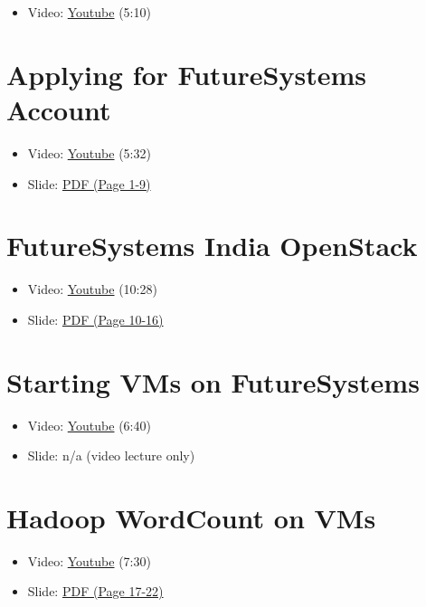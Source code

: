 \begin{itemize}
\tightlist
\item
  Video: \href{https://www.youtube.com/watch?v=zxoqRdvXM28}{Youtube}
  (5:10)
\end{itemize}

\section{Applying for FutureSystems
Account}\label{applying-for-futuresystems-account}

\begin{itemize}
\tightlist
\item
  Video: \href{https://www.youtube.com/watch?v=98ERlWi3k3U}{Youtube}
  (5:32)
\item
  Slide:
  \href{https://drive.google.com/open?id=0B88HKpainTSfZENxeUlOcVFUTkU}{PDF
  (Page 1-9)}
\end{itemize}

\section{FutureSystems India
OpenStack}\label{futuresystems-india-openstack}

\begin{itemize}
\tightlist
\item
  Video: \href{https://www.youtube.com/watch?v=hyKYTpNmJZc}{Youtube}
  (10:28)
\item
  Slide:
  \href{https://drive.google.com/open?id=0B88HKpainTSfZENxeUlOcVFUTkU}{PDF
  (Page 10-16)}
\end{itemize}

\section{Starting VMs on
FutureSystems}\label{starting-vms-on-futuresystems}

\begin{itemize}
\tightlist
\item
  Video: \href{https://www.youtube.com/watch?v=RPnhJs4IcfQ}{Youtube}
  (6:40)
\item
  Slide: n/a (video lecture only)
\end{itemize}

\section{Hadoop WordCount on VMs}\label{hadoop-wordcount-on-vms}

\begin{itemize}
\tightlist
\item
  Video: \href{https://www.youtube.com/watch?v=1TrjmcPHrRU}{Youtube}
  (7:30)
\item
  Slide:
  \href{https://drive.google.com/open?id=0B88HKpainTSfZENxeUlOcVFUTkU}{PDF
  (Page 17-22)}
\end{itemize}
